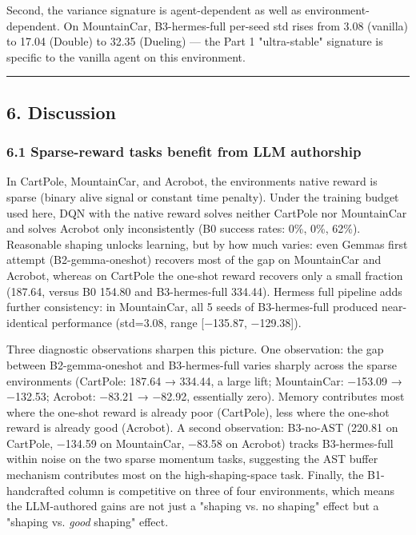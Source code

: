 Second, the variance signature is agent-dependent as well as environment-dependent. On MountainCar, B3-hermes-full per-seed std rises from 3.08 (vanilla) to 17.04 (Double) to 32.35 (Dueling) --- the Part 1 "ultra-stable" signature is specific to the vanilla agent on this environment.

\begin{center}\rule{0.5\linewidth}{0.5pt}\end{center}

\subsection{6. Discussion}\label{6-discussion}

\subsubsection{6.1 Sparse-reward tasks benefit from LLM authorship}\label{61-sparse-reward-tasks-benefit-from-llm-authorship}

In CartPole, MountainCar, and Acrobot, the environment\textquotesingle s native reward is sparse (binary alive signal or constant time penalty). Under the training budget used here, DQN with the native reward solves neither CartPole nor MountainCar and solves Acrobot only inconsistently (B0 success rates: 0\%, 0\%, 62\%). Reasonable shaping unlocks learning, but by how much varies: even Gemma\textquotesingle s first attempt (B2-gemma-oneshot) recovers most of the gap on MountainCar and Acrobot, whereas on CartPole the one-shot reward recovers only a small fraction (187.64, versus B0 154.80 and B3-hermes-full 334.44). Hermes\textquotesingle s full pipeline adds further consistency: in MountainCar, all 5 seeds of B3-hermes-full produced near-identical performance (std=3.08, range {[}−135.87, −129.38{]}).

Three diagnostic observations sharpen this picture. One observation: the gap between B2-gemma-oneshot and B3-hermes-full varies sharply across the sparse environments (CartPole: 187.64 → 334.44, a large lift; MountainCar: −153.09 → −132.53; Acrobot: −83.21 → −82.92, essentially zero). Memory contributes most where the one-shot reward is already poor (CartPole), less where the one-shot reward is already good (Acrobot). A second observation: B3-no-AST (220.81 on CartPole, −134.59 on MountainCar, −83.58 on Acrobot) tracks B3-hermes-full within noise on the two sparse momentum tasks, suggesting the AST buffer mechanism contributes most on the high-shaping-space task. Finally, the B1-handcrafted column is competitive on three of four environments, which means the LLM-authored gains are not just a "shaping vs. no shaping" effect but a "shaping vs. \emph{good} shaping" effect.

